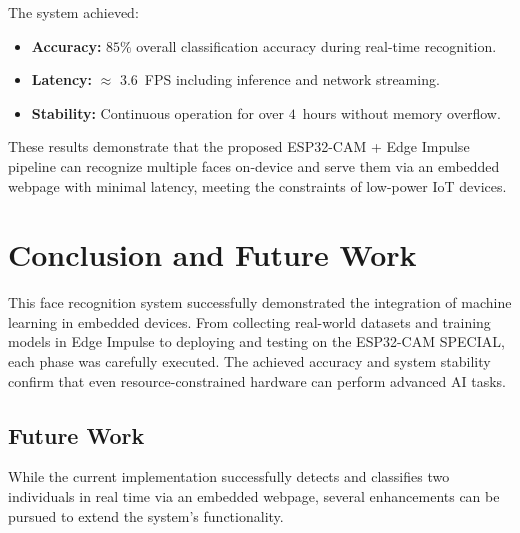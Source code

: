 The system achieved:
\begin{itemize}
    \item \textbf{Accuracy:} $85\%$ overall classification accuracy during real-time recognition.
    \item \textbf{Latency:} $\approx$ $3.6$~FPS including inference and network streaming.
    \item \textbf{Stability:} Continuous operation for over $4$~hours without memory overflow.
\end{itemize}


These results demonstrate that the proposed ESP32-CAM + Edge Impulse pipeline can recognize multiple faces on-device and serve them via an embedded webpage with minimal latency, meeting the constraints of low-power IoT devices.





\newpage
\section{Conclusion and Future Work}
This face recognition system successfully demonstrated the integration of machine learning in embedded devices. From collecting real-world datasets and training models in Edge Impulse to deploying and testing on the ESP32-CAM SPECIAL, each phase was carefully executed. The achieved accuracy and system stability confirm that even resource-constrained hardware can perform advanced AI tasks.

\subsection{Future Work}

While the current implementation successfully detects and classifies two individuals in real time via an embedded webpage, several enhancements can be pursued to extend the system’s functionality.

